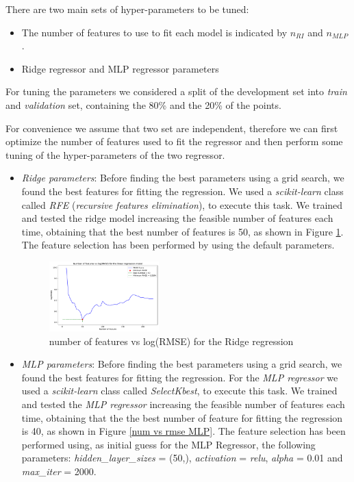 There are two main sets of hyper-parameters to be tuned:
\begin{itemize}
    \item The number of features to use to fit each model is indicated by $n_{RI}$ and $n_{MLP}$.
    \item Ridge regressor and MLP regressor parameters
\end{itemize}
For tuning the parameters we considered a split of the development set into \textit{train} and \textit{validation} set, containing the 80\% and the 20\% of the points.

For convenience we assume that two set are independent, therefore we can first optimize the number of features used to fit the regressor and then perform some tuning of the hyper-parameters of the two regressor.

\begin{itemize}
    \item \textit{Ridge parameters}: Before finding the best parameters using a grid search, we found the best features for fitting the regression. We used a \textit{scikit-learn} class called \textit{RFE}\cite{RFE} (\textit{recursive features elimination}), to execute this task. We trained and tested the ridge model increasing the feasible number of features each time, obtaining that the best number of features is 50, as shown in Figure \ref{num vs rmse}. The feature selection has been performed by using the default parameters.
    \begin{figure}
    \includegraphics[width = 0.40\textwidth]{img/rmse_curve_linear_2.pdf}
    \caption{number of features vs log(RMSE) for the Ridge regression}
    \label{num vs rmse}
    
\end{figure}


\item \textit{MLP parameters}: Before finding the best parameters using a grid search, we found the best features for fitting the regression. For the \textit{MLP regressor} we used a \textit{scikit-learn} class called \textit{SelectKbest}\cite{SelectKbest}, to execute this task. We trained and tested the \textit{MLP regressor} increasing the feasible number of features each time, obtaining that the the best number of feature for fitting the regression is 40, as shown in Figure \ref{num vs rmse MLP}. The feature selection has been performed using, as initial guess for the MLP Regressor, the following parameters: \textit{hidden\_layer\_sizes} = (50,), \textit{activation} = \textit{relu}, \textit{alpha} = 0.01 and \textit{max\_iter} = 2000.


\end{itemize}
